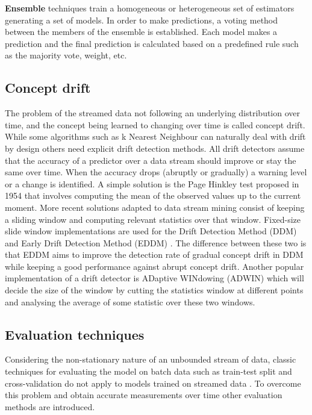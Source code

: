 \documentclass{sig-alternate-br}
\begin{document}
\textbf{Ensemble} techniques train a homogeneous \cite{bifet2012ensembles} or heterogeneous \cite{van2018online} set of estimators generating a set of models. In order to make predictions, a voting method between the members of the ensemble is established. Each model makes a prediction and the final prediction is calculated based on a predefined rule such as the majority vote, weight, etc.

\subsection{Concept drift}

The problem of the streamed data not following an underlying distribution over time, and the concept being learned to changing over time is called concept drift. While some algorithms such as k Nearest Neighbour can naturally deal with drift by design \cite{van2016massively} others need explicit drift detection methods. All drift detectors assume that the accuracy of a predictor over a data stream should improve or stay the same over time. When the accuracy drops (abruptly or gradually) a warning level or a change is identified. A simple solution is the Page Hinkley test proposed in 1954 \cite{page1954continuous} that involves computing the mean of the observed values up to the current moment. More recent solutions adapted to data stream mining consist of keeping a sliding window and computing relevant statistics over that window. Fixed-size slide window implementations are used for the Drift Detection Method (DDM) \cite{gama2004learning} and Early Drift Detection Method (EDDM) \cite{baena2006early}. The difference between these two is that EDDM aims to improve the detection rate of gradual concept drift in DDM while keeping a good performance against abrupt concept drift. Another popular implementation of a drift detector is ADaptive WINdowing (ADWIN) \cite{bifet2007learning} which will decide the size of the window by cutting the statistics window at different points and analysing the average of some statistic over these two windows.

\vspace{1cm}

\subsection{Evaluation techniques}
\label{evaluation}

Considering the non-stationary nature of an unbounded stream of data, classic techniques for evaluating the model on batch data such as train-test split and cross-validation do not apply to models trained on streamed data \cite{gama2009issues}. To overcome this problem and obtain accurate measurements over time other evaluation methods are introduced.
\end{document}

